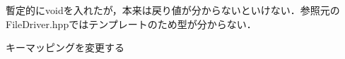 
\begin{DoxyRefList}
\item[Class \mbox{\hyperlink{classfileIO_1_1FileIO}{file\+IO\+::File\+IO}} ]\label{todo__todo000001}%
%
暫定的にvoidを入れたが，本来は戻り値が分からないといけない．参照元の\+File\+Driver.\+hppではテンプレートのため型が分からない．  
\item[Member \mbox{\hyperlink{classUI_1_1NcursesUI_a747800e9d9fc788a5c879a410a0d6f03}{UI\+::Ncurses\+UI\+::Get\+Input}} () -\/$>$ \mbox{\hyperlink{namespacetextEditor_ade3de5dab8e0c8cbcfb9bf305a51af4e}{text\+Editor\+::\+Key}} override]\label{todo__todo000002}%
%
キーマッピングを変更する 
\end{DoxyRefList}